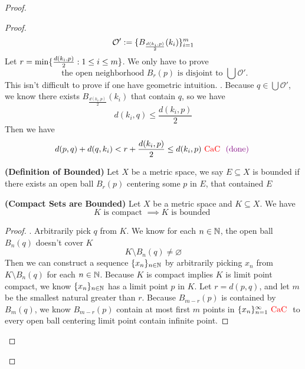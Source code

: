 \documentclass{report}
\begin{document}
\begin{proof}
\begin{proof}
\begin{equation}
\mathcal{O}':=\{ B_{\frac{d(k_i,p)}{2}}(k_i) \}_{i=1}^m
\end{equation}
Let $r=\min \{ \frac{d(k_i,p)}{2}:1\leq i\leq m \}$. We only have to prove 
\begin{equation}
  \text{ the open neighborhood $B_r(p)$ is disjoint to $\bigcup \mathcal{O}'$.}
\end{equation}
This isn't difficult to prove if one have geometric intuition.  . Because $q\in \bigcup \mathcal{O}'$, we know there exists $B_{\frac{d(k_i,p)}{2}}(k_i)$ that contain $q$, so we have
 \begin{equation}
d(k_i,q)\leq \frac{d(k_i,p)}{2}
\end{equation}
Then we have
\begin{equation}
d(p,q)+d(q,k_i)< r+\frac{d(k_i,p)}{2}\leq d(k_i,p)\text{ \textcolor{red}{CaC} }\textcolor{violet}{\text{ (done) }}
\end{equation}
\begin{definition}
\label{3.6.4}
\textbf{(Definition of Bounded)} Let $X$ be a metric space, we say $E\subseteq X$ is bounded if there exists an open ball $B_r(p)$ centering some $p$ in $E$, that contained $E$
\end{definition}
\begin{theorem}
\label{3.6.5}
\textbf{(Compact Sets are Bounded)} Let $X$ be a metric space and $K\subseteq X$. We have
\begin{equation}
K\text{ is compact }\implies K\text{ is bounded }
\end{equation}
\end{theorem}
\begin{proof}
. Arbitrarily pick $q$ from  $K$. We know for each $n\in\mathbb{N}$, the open ball $B_n(q)$ doesn't cover $K$  
\begin{equation}
K\setminus B_n(q)\neq \varnothing
\end{equation}
Then we can construct a sequence $\{ x_n \}_{n\in\mathbb{N}}$ by arbitrarily picking $x_n$ from $K\setminus B_n(q)$ for each $n\in\mathbb{N}$. Because  $K$ is compact implies $K$ is limit point compact, we know $\{ x_n \}_{n\in\mathbb{N}}$ has a limit point  $p$ in  $K$. Let $r=d(p,q)$, and let $m$ be the smallest natural greater than  $r$. Because $B_{m-r}(p)$ is contained by $B_m(q)$, we know $B_{m-r}(p)$ contain at most first $m$ points in  $\{ x_n \}_{n=1}^\infty\text{ \textcolor{red}{CaC} }$ to every open ball centering limit point contain infinite point.
\end{proof}
\begin{corollary}

\end{corollary}
\end{proof}
\end{proof}
\end{document}
